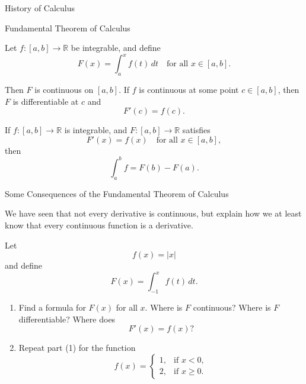 \documentclass[12pt,a4paper]{article}
\begin{document}
\FrontPage
\Large

\begin{heading}
    History of Calculus
\end{heading}

\vspace{10pt}

\clearpage

\begin{heading}
    Fundamental Theorem of Calculus
\end{heading}

\vspace{10pt}

\begin{theorem}
    Let \(f:[a,b]\to\mathbb{R}\) be integrable, and define
\[
F(x)=\int_a^x f(t)\,dt \quad \text{for all } x\in[a,b].
\]

Then \(F\) is continuous on \([a,b]\). If \(f\) is continuous at some point
\(c\in[a,b]\), then \(F\) is differentiable at \(c\) and
\[
F'(c)=f(c).
\]
\end{theorem}

\clearpage

\begin{theorem}
    If \(f:[a,b]\to\mathbb{R}\) is integrable, and
\(F:[a,b]\to\mathbb{R}\) satisfies
\[
F'(x)=f(x) \quad \text{for all } x\in[a,b],
\]
then
\[
\int_a^b f = F(b)-F(a).
\]
\end{theorem}

\clearpage

\begin{heading}
    Some Consequences of the Fundamental Theorem of Calculus
\end{heading}

\vspace{10pt}

\begin{theorem}
We have seen that not every derivative is continuous, but explain how we at least know that every continuous function is a derivative.
\end{theorem}

\clearpage

\begin{theorem}
Let
\[
f(x)=|x|
\]
and define
\[
F(x)=\int_{-1}^{x} f(t)\,dt.
\]

\begin{enumerate}
    \item Find a formula for \(F(x)\) for all \(x\). Where is \(F\) continuous? Where is \(F\) differentiable? Where does
    \[
    F'(x)=f(x)?
    \]

    \item Repeat part (1) for the function
    \[
    f(x)=
    \begin{cases}
        1, & \text{if } x<0,\\
        2, & \text{if } x\ge 0.
    \end{cases}
    \]
\end{enumerate}
\end{theorem}
\end{document}
